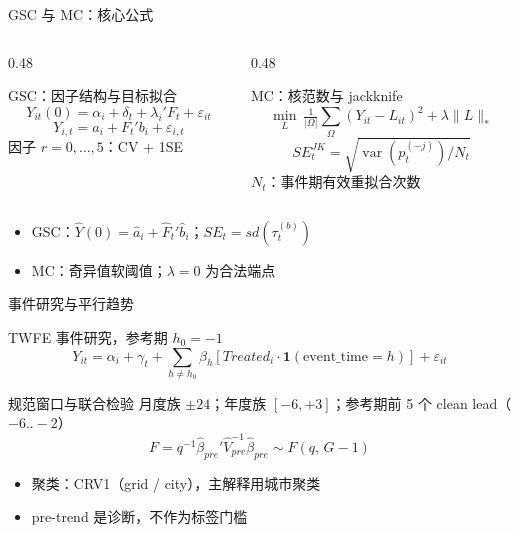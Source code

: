 \documentclass[aspectratio=169,11pt]{beamer}
\begin{document}
\begin{frame}{GSC 与 MC：核心公式}
  \begin{columns}[T]
    \begin{column}{0.48\textwidth}
      \begin{block}{GSC：因子结构与目标拟合}
        \small
        \[ Y_{it}(0)=\alpha_i+\delta_t+\lambda_i'F_t+\varepsilon_{it} \]
        \[ Y_{i,t}=a_i+F_t'b_i+\varepsilon_{i,t} \]
        因子 $r=0,\dots,5$：CV + 1SE
      \end{block}
    \end{column}
    \begin{column}{0.48\textwidth}
      \begin{block}{MC：核范数与 jackknife}
        \small
        \[ \min_L\ \tfrac{1}{|\Omega|}\sum_{\Omega}(Y_{it}-L_{it})^2
        +\lambda\|L\|_* \]
        \[ SE_t^{JK}=\sqrt{\operatorname{var}(p_t^{(-j)})/N_t} \]
        $N_t$：事件期有效重拟合次数
      \end{block}
    \end{column}
  \end{columns}
  \medskip
  \begin{itemize}
    \item GSC：$\hat Y(0)=\hat a_i+\hat F_t'\hat b_i$；$SE_t=sd(\tau_t^{(b)})$
    \item MC：奇异值软阈值；$\lambda=0$ 为合法端点
  \end{itemize}
\end{frame}

\begin{frame}{事件研究与平行趋势}
  \small
  \begin{block}{TWFE 事件研究，参考期 $h_0=-1$}
    \[
      Y_{it}=\alpha_i+\gamma_t+\sum_{h\neq h_0}\beta_h
      \left[Treated_i\cdot\mathbf{1}(\text{event\_time}=h)\right]+\varepsilon_{it}
    \]
  \end{block}
  \begin{block}{规范窗口与联合检验}
    月度族 $\pm24$；年度族 $[-6,+3]$；参考期前 5 个 clean lead（$-6..-2$）
    \[
      F=q^{-1}\hat\beta_{pre}'\hat V_{pre}^{-1}\hat\beta_{pre}
      \sim F(q,\,G-1)
    \]
  \end{block}
  \begin{itemize}
    \item 聚类：CRV1（grid / city），主解释用城市聚类
    \item pre-trend 是诊断，不作为标签门槛
  \end{itemize}
\end{frame}
\end{document}

